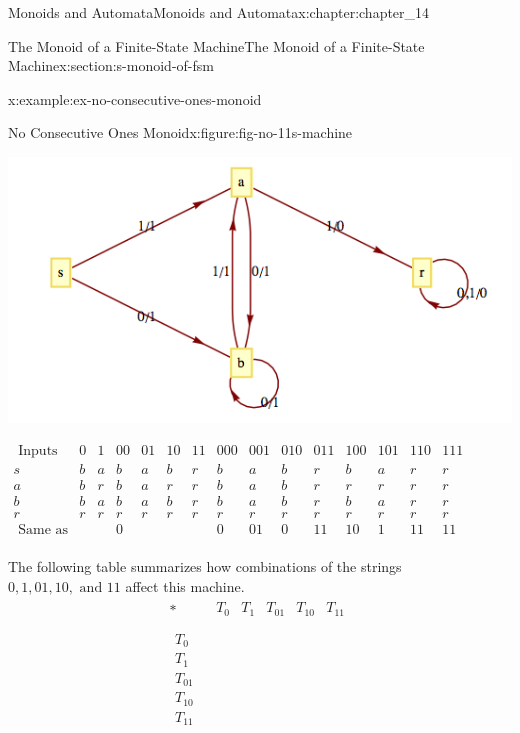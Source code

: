 \documentclass[oneside,10pt,]{book}
\numberwithin{equation}{section}
\begin{document}
\begin{chapterptx}{Monoids and Automata}{}{Monoids and Automata}{}{}{x:chapter:chapter_14}
\begin{sectionptx}{The Monoid of a Finite-State Machine}{}{The Monoid of a Finite-State Machine}{}{}{x:section:s-monoid-of-fsm}
\begin{example}{}{x:example:ex-no-consecutive-ones-monoid}
\begin{figureptx}{No Consecutive Ones Monoid}{x:figure:fig-no-11s-machine}{}
\begin{image}{0.15}{0.7}{0.15}
\includegraphics[width=\linewidth]{images/fig-no-11s-machine.png}
\end{image}%
\tcblower
\end{figureptx}%
\(\begin{array}{ccccccccccccccc}
\textrm{ Inputs} & 0 & 1 & 00 & 01 & 10 & 11 & 000 & 001 & 010 & 011 & 100 & 101 & 110 & 111 \\
s & b & a & b & a & b & r & b & a & b & r & b & a & r & r \\
a & b & r & b & a & r & r & b & a & b & r & r & r & r & r \\
b & b & a & b & a & b & r & b & a & b & r & b & a & r & r \\
r & r & r & r & r & r & r & r & r & r & r & r & r & r & r \\
\textrm{ Same} \textrm{ as} &   &   & 0 &   &   &   & 0 & 01 & 0 & 11 & 10 & 1 & 11 & 11 \\
\end{array}\)%
\par
The following table summarizes how combinations of the strings \(0,1,01,10, \textrm{ and } 11\) affect this machine.%
\begin{equation*}
\begin{array}{c|c}
* & 
\begin{array}{ccccc}
T_0 & T_1 & T_{01} & T_{10} & T_{11} \\
\end{array}
\\
\hline
\begin{array}{c}
T_0 \\
T_1 \\
T_{01} \\
T_{10} \\
T_{11} \\
\end{array}
& 
\begin{array}{ccccc}

\end{array}
\end{array}
\end{equation*}
\end{example}
\end{sectionptx}
\end{chapterptx}
\end{document}
